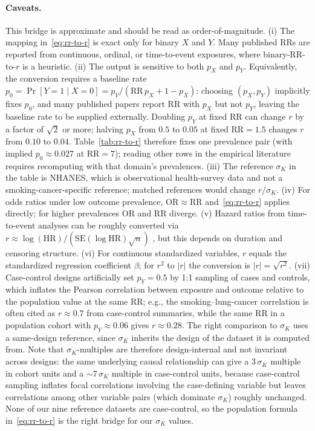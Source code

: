 \paragraph{Caveats.}
This bridge is approximate and should be read as order-of-magnitude.
(i) The mapping in~\eqref{eq:rr-to-r} is exact only for binary $X$ and $Y$. Many published RRs are reported from continuous, ordinal, or time-to-event exposures, where binary-RR-to-$r$ is a heuristic.
(ii) The output is sensitive to both $p_X$ and $p_Y$. Equivalently, the conversion requires a baseline rate $p_0 = \Pr[Y=1\mid X=0] = p_Y/(\mathrm{RR}\,p_X + 1 - p_X)$: choosing $(p_X,p_Y)$ implicitly fixes $p_0$, and many published papers report RR with $p_X$ but not $p_Y$, leaving the baseline rate to be supplied externally. Doubling $p_Y$ at fixed RR can change $r$ by a factor of $\sqrt{2}$ or more; halving $p_X$ from $0.5$ to $0.05$ at fixed RR$=1.5$ changes $r$ from $0.10$ to $0.04$. Table~\ref{tab:rr-to-r} therefore fixes one prevalence pair (with implied $p_0\approx 0.027$ at RR$=7$); reading other rows in the empirical literature requires recomputing with that domain's prevalences.
(iii) The reference $\sigma_K$ in the table is NHANES, which is observational health-survey data and not a smoking-cancer-specific reference; matched references would change $r/\sigma_K$.
(iv) For odds ratios under low outcome prevalence, $\mathrm{OR}\approx \mathrm{RR}$ and~\eqref{eq:rr-to-r} applies directly; for higher prevalences OR and RR diverge.
(v) Hazard ratios from time-to-event analyses can be roughly converted via $r\approx \log(\mathrm{HR})/(\mathrm{SE}(\log\mathrm{HR})\sqrt{n})$ \citep[as we use for the folate worked example,][\S\ref{sec:worked-examples}]{liu2022}, but this depends on duration and censoring structure.
(vi) For continuous standardized variables, $r$ equals the standardized regression coefficient $\beta$; for $r^2$ to $|r|$ the conversion is $|r|=\sqrt{r^2}$.
(vii) Case-control designs artificially set $p_Y=0.5$ by 1:1 sampling of cases and controls, which inflates the Pearson correlation between exposure and outcome relative to the population value at the same RR; e.g., the smoking--lung-cancer correlation is often cited as $r\approx 0.7$ from case-control summaries, while the same RR in a population cohort with $p_Y\approx 0.06$ gives $r\approx 0.28$. The right comparison to $\sigma_K$ uses a same-design reference, since $\sigma_K$ inherits the design of the dataset it is computed from. Note that $\sigma_K$-multiples are therefore design-internal and not invariant across designs: the same underlying causal relationship can give a $3\,\sigma_K$ multiple in cohort units and a $\sim 7\,\sigma_K$ multiple in case-control units, because case-control sampling inflates focal correlations involving the case-defining variable but leaves correlations among other variable pairs (which dominate $\sigma_K$) roughly unchanged. None of our nine reference datasets are case-control, so the population formula in~\eqref{eq:rr-to-r} is the right bridge for our $\sigma_K$ values.

